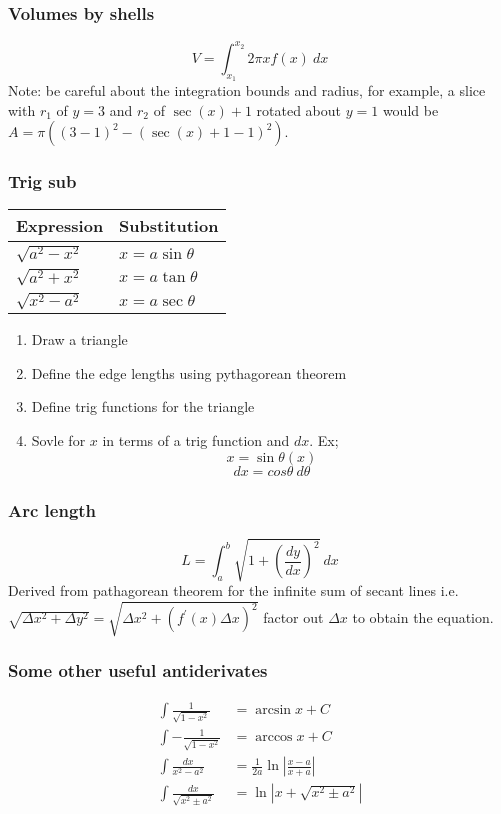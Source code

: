 \documentclass{article}
\begin{document}
\begin{multicols}{2}
\subsubsection*{Volumes by shells}
\[
	V = \int_{x_1}^{x_2} 2\pi x f(x)\ dx
\]
Note: be careful about the integration bounds and radius, for example,  a slice with $r_1$ of $y=3$ and $r_2$ of $\sec(x) + 1$ rotated about $y=1$ would be\\ $A = \pi \left( (3-1)^2 - (\sec(x) + 1 - 1)^2 \right)$.

\subsubsection*{Trig sub}
\begin{minipage}{0.2\textwidth}
    \begin{tabular}{|l|l|}
        \hline
        Expression & Substitution\\
        \hline
        $\sqrt{a^2-x^2}$ & $x=a\sin\theta$\\
        $\sqrt{a^2+x^2}$ & $x=a\tan\theta$\\
        $\sqrt{x^2-a^2}$ & $x=a\sec\theta$\\
        \hline
    \end{tabular}
\end{minipage}
\begin{minipage}{0.3\textwidth}
    \begin{enumerate}
	\item Draw a triangle
	\item Define the edge lengths using pythagorean theorem
	\item Define trig functions for the triangle
	\item Sovle for $x$ in terms of a trig function and $dx$. Ex;
		\[
			x = \sin \theta (x)
		\]
		\[
			dx = cos \theta\ d \theta
		\]
    \end{enumerate}
\end{minipage}

\subsubsection*{Arc length}
\[
	L = \int_a^b \sqrt{1 + \left(\frac{dy}{dx}\right)^2}\ dx
\]
Derived from pathagorean theorem for the infinite sum of secant lines i.e. $\sqrt{\Delta x^2 + \Delta y^2} = \sqrt{\Delta x^2 + (f^\prime(x)\Delta x)^2}$ factor out $\Delta x$ to obtain the equation.

\subsubsection*{Some other useful antiderivates}
\begin{align*}
	\int \frac{1}{\sqrt{1-x^2}} &= \arcsin x + C \\
	\int -\frac{1}{\sqrt{1-x^2}} &= \arccos x + C \\
	\int \frac{dx}{x^2-a^2} &= \frac{1}{2a} \ln \left| \frac{x-a}{x+a} \right| \\
	\int \frac{dx}{\sqrt{x^2 \pm a^2}} &= \ln \left| x + \sqrt{x^2 \pm a^2} \right| \\
\end{align*}


\end{multicols}
\end{document}
